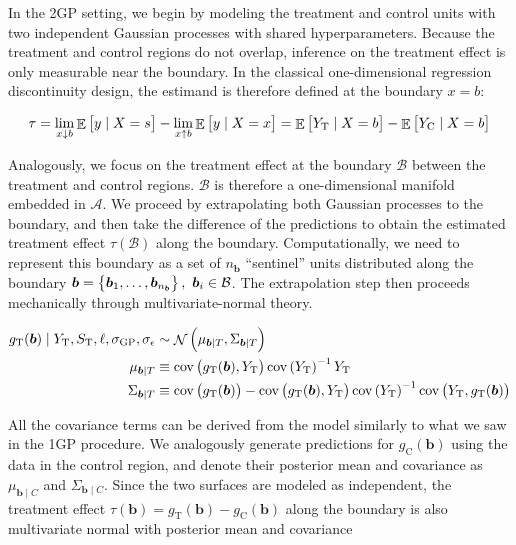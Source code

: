 \documentclass[letter]{article}
\DeclareMathOperator{\E}{\mathbb{E}}
\DeclareMathOperator{\cov}{{cov}}
\DeclareMathOperator{\normal}{\mathcal{N}}
\newcommand{\area}{\mathcal{A}}
\newcommand{\treat}{\mathrm{T}}
\newcommand{\ctrol}{\mathrm{C}}
\newcommand{\sigmaf}{\sigma_{\mathrm{GP}}}
\newcommand{\sigman}{\sigma_{\epsilon}}
\newcommand{\boundary}{\mathcal{B}}
\newcommand{\sentinels}{\bm{b}}
\newcommand{\numsent}{n_{\sentinels}}
\begin{document}
In the 2GP setting, we begin by modeling the treatment and control units with two independent Gaussian processes with shared hyperparameters. Because the treatment and control regions do not overlap, inference on the treatment effect is only measurable near the boundary. In the classical one-dimensional regression discontinuity design, the estimand is therefore defined at the boundary \(x=b\):

\begin{equation}
\tau = \lim_{x \downarrow b} \E\sbr{y \mid X=s} - \lim_{x \uparrow b} \E\sbr{y \mid X=x} = \E\sbr{Y_\treat{} \mid X=b} - \E\sbr{Y_\ctrol{} \mid X=b}
\end{equation}

Analogously, we focus on the treatment effect at the boundary \(\boundary\) between the treatment and control regions. \(\boundary\) is therefore a one-dimensional manifold embedded in \(\area\).
We proceed by extrapolating both Gaussian processes to the boundary,
and then take the difference of the predictions to obtain the estimated treatment effect \(\tau(\boundary)\) along the boundary.
Computationally, we need to represent this boundary as a set of \(\numsent\) ``sentinel'' units distributed along the boundary \(\sentinels=\cbr{\sentinels_1,\ldots,\sentinels_{\numsent}},~\sentinels_i \in \boundary\).
The extrapolation step then proceeds mechanically through multivariate-normal theory.

\begin{equation}\begin{split}
    g_\treat{}(\sentinels) \mid Y_\treat{}, S_\treat{}, \ell, \sigmaf, \sigman &\sim \normal\del{\mu_{\sentinels \mid T}, \Sigma_{\sentinels \mid T}} \\
    \mu_{\sentinels \mid T} &\equiv \cov\del{g_\treat{}(\sentinels), Y_\treat{}} \cov\del{Y_\treat{}}^{-1}  Y_\treat{} \\
    \Sigma_{\sentinels \mid T} &\equiv \cov \del{g_\treat{}(\sentinels)} - \cov\del{g_\treat{}(\sentinels), Y_\treat{}} \cov\del{Y_\treat{}}^{-1} \cov\del{Y_\treat{},g_\treat{}(\sentinels) \label{eq:postvar2gp}
    }
\end{split}\end{equation}

All the covariance terms can be derived from the model similarly to what we saw in the 1GP procedure.
We analogously generate predictions for \(g_\ctrol{}(\sentinels)\) using the data in the control region, and denote their posterior mean and covariance as \(\mu_{\sentinels \mid C}\) and \(\Sigma_{\sentinels \mid C}\). Since the two surfaces are modeled as independent, the treatment effect \(\tau(\sentinels)=g_\treat{}(\sentinels)-g_\ctrol{}(\sentinels)\) along the boundary is also multivariate normal with posterior mean and covariance
\end{document}
